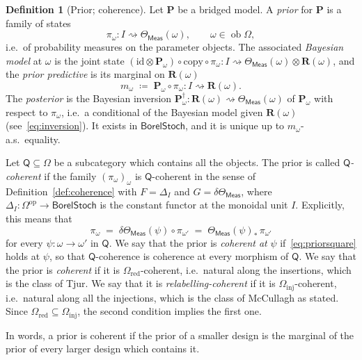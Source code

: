 \documentclass[11pt,a4paper]{article}
\theoremstyle{plain}
\theoremstyle{definition}
\newtheorem{definition}[theorem]{Definition}
\theoremstyle{remark}
\newcommand{\cat}[1]{\mathsf{#1}}
\newcommand{\catO}{\cat{\Omega}}
\newcommand{\Meas}{\cat{Meas}}
\newcommand{\op}{\mathrm{op}}
\newcommand{\id}{\mathrm{id}}
\newcommand{\del}{\delta}
\DeclareMathOperator{\ob}{ob}
\newcommand{\BorelStoch}{\cat{BorelStoch}}
\begin{document}
\begin{definition}[Prior; coherence]\label{def:prior}
Let $\mathbf P$ be a bridged model. A \emph{prior} for $\mathbf P$ is a family
of states
\[
\pi_{\omega} \colon I \rightsquigarrow \Theta_\Meas(\omega),
\qquad \omega \in \ob\catO ,
\]
i.e.\ of probability measures on the parameter objects. The associated
\emph{Bayesian model} at $\omega$ is the joint state
$(\id \otimes \mathbf P_{\omega}) \circ \mathrm{copy} \circ \pi_{\omega}
\colon I \rightsquigarrow \Theta_\Meas(\omega) \otimes \mathbf{R}(\omega)$,
and the \emph{prior predictive} is its marginal on $\mathbf{R}(\omega)$
\[
m_{\omega} \;\coloneqq\; \mathbf P_{\omega} \circ \pi_{\omega}
\colon I \rightsquigarrow \mathbf{R}(\omega).
\]
The \emph{posterior} is the Bayesian inversion
$\mathbf P_{\omega}^{\dagger} \colon \mathbf{R}(\omega) \rightsquigarrow
\Theta_\Meas(\omega)$ of $\mathbf P_{\omega}$ with respect to $\pi_{\omega}$,
i.e.\ a conditional of the Bayesian model given $\mathbf{R}(\omega)$
(see~\eqref{eq:inversion}). It exists in $\BorelStoch$, and it is unique up to
$m_{\omega}$-a.s.\ equality.

Let $\cat{Q} \subseteq \catO$ be a subcategory which contains all the objects.
The prior is called \emph{$\cat{Q}$-coherent} if the family
$(\pi_{\omega})_{\omega}$ is $\cat{Q}$-coherent in the sense of
Definition~\ref{def:coherence} with $F = \Delta_{I}$ and
$G = \del\Theta_\Meas$, where
$\Delta_{I} \colon \catO^{\op} \to \BorelStoch$ is the constant functor at the
monoidal unit $I$. Explicitly, this means that
\begin{equation}\label{eq:priorsquare}
\pi_{\omega} \;=\; \del\Theta_\Meas(\psi)\circ\pi_{\omega'}
\;=\; \Theta_\Meas(\psi)_{*}\,\pi_{\omega'}
\end{equation}
for every $\psi \colon \omega \to \omega'$ in $\cat{Q}$. We say that the prior
is \emph{coherent at} $\psi$ if~\eqref{eq:priorsquare} holds at $\psi$, so
that $\cat{Q}$-coherence is coherence at every morphism of $\cat{Q}$. We say
that the prior is \emph{coherent} if it is $\catO_{\mathrm{red}}$-coherent,
i.e.\ natural along the insertions, which is the class of Tjur. We say that it is
\emph{relabelling-coherent} if it is $\catO_{\mathrm{inj}}$-coherent, i.e.\
natural along all the injections, which is the class of McCullagh as stated.
Since $\catO_{\mathrm{red}} \subseteq \catO_{\mathrm{inj}}$, the second
condition implies the first one.
\end{definition}

In words, a prior is coherent if the prior of a smaller design is the marginal
of the prior of every larger design which contains it.
\end{document}
